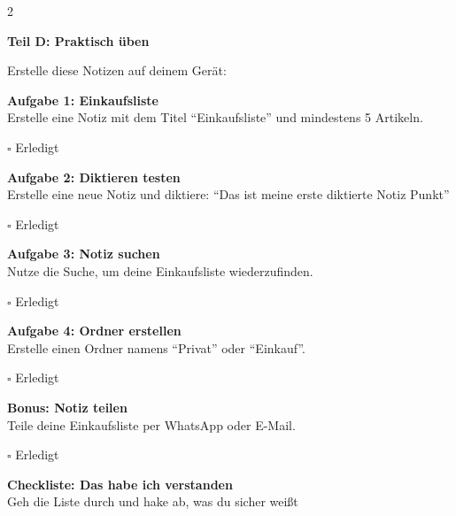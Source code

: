 \documentclass[a4paper,landscape,8pt]{extarticle}
\begin{document}
\begin{multicols}{2}
\columnbreak

\textbf{\large Teil D: Praktisch üben}

Erstelle diese Notizen auf deinem Gerät:

\vspace{3mm}

\textbf{Aufgabe 1: Einkaufsliste}\\
Erstelle eine Notiz mit dem Titel ``Einkaufsliste'' und mindestens 5 Artikeln.

\vspace{2mm}
$\square$ Erledigt

\vspace{5mm}

\textbf{Aufgabe 2: Diktieren testen}\\
Erstelle eine neue Notiz und diktiere: ``Das ist meine erste diktierte Notiz Punkt''

\vspace{2mm}
$\square$ Erledigt

\vspace{5mm}

\textbf{Aufgabe 3: Notiz suchen}\\
Nutze die Suche, um deine Einkaufsliste wiederzufinden.

\vspace{2mm}
$\square$ Erledigt

\vspace{5mm}

\textbf{Aufgabe 4: Ordner erstellen}\\
Erstelle einen Ordner namens ``Privat'' oder ``Einkauf''.

\vspace{2mm}
$\square$ Erledigt

\vspace{5mm}

\textbf{Bonus: Notiz teilen}\\
Teile deine Einkaufsliste per WhatsApp oder E-Mail.

\vspace{2mm}
$\square$ Erledigt

\end{multicols}

\newpage


\begin{center}
{\LARGE\bfseries Checkliste: Das habe ich verstanden}\\[3pt]
{\normalsize Geh die Liste durch und hake ab, was du sicher weißt}
\end{center}
\end{document}
